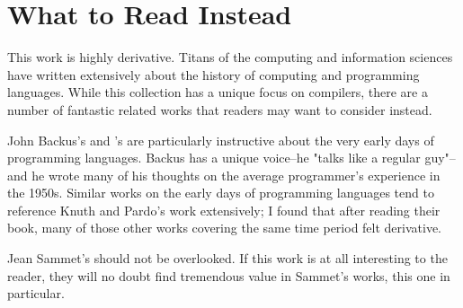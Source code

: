 \chapter{What to Read Instead}

This work is highly derivative.
Titans of the computing and information sciences have written extensively
about the history of computing and programming languages.
While this collection has a unique focus on compilers, there are a number
of fantastic related works that readers may want to consider instead.

John Backus's 
and \citeauthor{Knuth_TrabbPardo_1976_Early_Development}'s
 are particularly instructive
about the very early days of programming languages.
Backus has a unique voice--he "talks like a regular guy"--and he wrote many of
his thoughts on the average programmer's experience in the 1950s.
Similar works on the early days of programming languages tend to reference
Knuth and Pardo's work extensively; I found that after reading their book,
many of those other works covering the same time period felt derivative.

Jean Sammet's 
should not be overlooked. If this work is at all interesting to the reader, they
will no doubt find tremendous value in Sammet's works, this one in particular.
